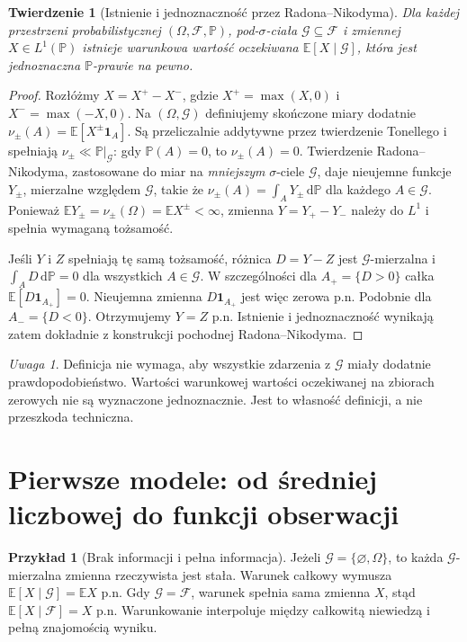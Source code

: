 \documentclass[11pt,a4paper,oneside]{report}
\numberwithin{equation}{chapter}
\theoremstyle{plain}
\newtheorem{twierdzenie}{Twierdzenie}[chapter]
\theoremstyle{definition}
\newtheorem{przyklad}{Przykład}[chapter]
\theoremstyle{remark}
\newtheorem{uwaga}{Uwaga}[chapter]
\newcommand{\Prob}{\mathbb{P}}
\newcommand{\E}{\mathbb{E}}
\newcommand{\ind}[1]{\mathbf{1}_{#1}}
\newcommand{\dd}{\mathrm{d}}
\begin{document}
\begin{twierdzenie}[Istnienie i jednoznaczność przez Radona--Nikodyma]
Dla każdej przestrzeni probabilistycznej
$(\Omega,\mathcal F,\Prob)$, pod-$\sigma$-ciała
$\mathcal G\subseteq\mathcal F$ i zmiennej
$X\in L^1(\Prob)$ istnieje warunkowa wartość
oczekiwana $\E[X\mid\mathcal G]$, która jest
jednoznaczna $\Prob$-prawie na pewno.
\end{twierdzenie}
\begin{proof}
Rozłóżmy $X=X^+-X^-$, gdzie
$X^+=\max(X,0)$ i $X^-=\max(-X,0)$.
Na $(\Omega,\mathcal G)$ definiujemy skończone
miary dodatnie $\nu_\pm(A)=\E[X^\pm\ind A]$.
Są przeliczalnie addytywne przez twierdzenie
Tonellego i spełniają $\nu_\pm\ll\Prob|_\mathcal G$:
gdy $\Prob(A)=0$, to $\nu_\pm(A)=0$.
Twierdzenie Radona--Nikodyma, zastosowane do miar
na \emph{mniejszym} $\sigma$-ciele $\mathcal G$,
daje nieujemne funkcje $Y_\pm$, mierzalne względem
$\mathcal G$, takie że
$\nu_\pm(A)=\int_A Y_\pm\,\dd\Prob$ dla
każdego $A\in\mathcal G$. Ponieważ
$\E Y_\pm=\nu_\pm(\Omega)=\E X^\pm<\infty$,
zmienna $Y=Y_+-Y_-$ należy do $L^1$ i spełnia
wymaganą tożsamość.

Jeśli $Y$ i $Z$ spełniają tę samą tożsamość,
różnica $D=Y-Z$ jest $\mathcal G$-mierzalna i
$\int_A D\,\dd\Prob=0$ dla wszystkich
$A\in\mathcal G$. W szczególności dla
$A_+=\{D>0\}$ całka $\E[D\ind{A_+}]=0$.
Nieujemna zmienna $D\ind{A_+}$ jest więc zerowa
p.n. Podobnie dla $A_-=\{D<0\}$.
Otrzymujemy $Y=Z$ p.n. Istnienie i jednoznaczność
wynikają zatem dokładnie z konstrukcji pochodnej
Radona--Nikodyma.
\end{proof}

\begin{uwaga}
Definicja nie wymaga, aby wszystkie zdarzenia
z $\mathcal G$ miały dodatnie prawdopodobieństwo.
Wartości warunkowej wartości oczekiwanej na zbiorach
zerowych nie są wyznaczone jednoznacznie. Jest to
własność definicji, a nie przeszkoda techniczna.
\end{uwaga}

\section{Pierwsze modele: od średniej liczbowej do funkcji obserwacji}

\begin{przyklad}[Brak informacji i pełna informacja]
Jeżeli $\mathcal G=\{\varnothing,\Omega\}$, to
każda $\mathcal G$-mierzalna zmienna rzeczywista jest
stała. Warunek całkowy wymusza
$\E[X\mid\mathcal G]=\E X$ p.n. Gdy
$\mathcal G=\mathcal F$, warunek spełnia sama
zmienna $X$, stąd $\E[X\mid\mathcal F]=X$ p.n.
Warunkowanie interpoluje między całkowitą niewiedzą
i pełną znajomością wyniku.
\end{przyklad}
\end{document}
